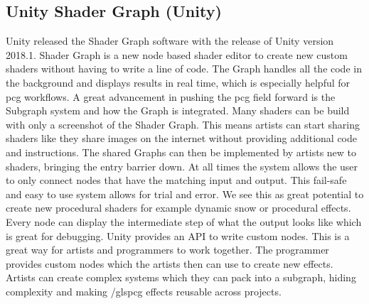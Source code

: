 \documentclass[10pt,a4paper]{article}
\begin{document}
\subsection{Unity Shader Graph (Unity)}
\begin{multicols}{2}
Unity released the Shader Graph software with the release of Unity version 2018.1. Shader Graph is a new node based shader editor to create new custom shaders without having to write a line of code. The Graph handles all the code in the background and displays results in real time, which is especially helpful for \gls{pcg} workflows. A great advancement in pushing the \gls{pcg} field forward is the Subgraph system and how the Graph is integrated. Many shaders can be build with only a screenshot of the Shader Graph. This means artists can start sharing shaders like they share images on the internet without providing additional code and instructions. The shared Graphs can then be implemented by artists new to shaders, bringing the entry barrier down. At all times the system allows the user to only connect nodes that have the matching input and output. This fail-safe and easy to use system allows for trial and error. We see this as great potential to create new procedural shaders for example dynamic snow or procedural effects. Every node can display the intermediate step of what the output looks like which is great for debugging. Unity provides an API to write custom nodes. This is a great way for artists and programmers to work together. The programmer provides custom nodes which the artists then can use to create new effects. Artists can create complex systems which they can pack into a subgraph, hiding complexity and making /gls{pcg} effects reusable across projects.
\end{multicols}
\end{document}
